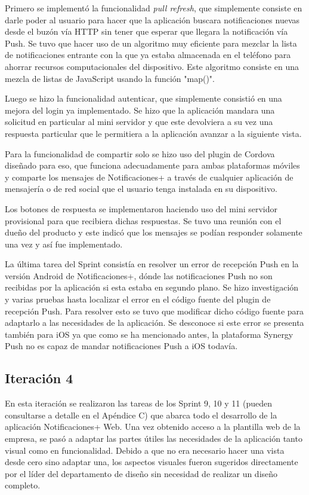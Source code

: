 Primero se implementó la funcionalidad \textit{pull refresh}, que simplemente consiste en darle poder al usuario para hacer que la aplicación buscara notificaciones nuevas desde el buzón vía HTTP sin tener que esperar que llegara la notificación vía Push. Se tuvo que hacer uso de un algoritmo muy eficiente para mezclar la lista de notificaciones entrante con la que ya estaba almacenada en el teléfono para ahorrar recursos computacionales del dispositivo. Este algoritmo consiste en una mezcla de listas de JavaScript usando la función "map()".

Luego se hizo la funcionalidad autenticar, que simplemente consistió en una mejora del login ya implementado. Se hizo que la aplicación mandara una solicitud en particular al mini servidor y que este devolviera a su vez una respuesta particular que le permitiera a la aplicación avanzar a la siguiente vista.


Para la funcionalidad de compartir solo se hizo uso del plugin de Cordova diseñado para eso, que funciona adecuadamente para ambas plataformas móviles y comparte los mensajes de Notificaciones+ a través de cualquier aplicación de mensajería o de red social que el usuario tenga instalada en su dispositivo. 


Los botones de respuesta se implementaron haciendo uso del mini servidor provisional para que recibiera dichas respuestas. Se tuvo una reunión con el dueño del producto y este indicó que los mensajes se podían responder solamente una vez y así fue implementado.


La última tarea del Sprint consistía en resolver un error de recepción Push en la versión Android de Notificaciones+, dónde las notificaciones Push no son recibidas por la aplicación si esta estaba en segundo plano. Se hizo investigación y varias pruebas hasta localizar el error en el código fuente del plugin de recepción Push. Para resolver esto se tuvo que modificar dicho código fuente para adaptarlo a las necesidades de la aplicación. Se desconoce si este error se presenta también para iOS ya que como se ha mencionado antes, la plataforma Synergy Push no es capaz de mandar notificaciones Push a iOS todavía.


\subsection{Iteración 4}
En esta iteración se realizaron las tareas de los Sprint 9, 10 y 11 (pueden consultarse a detalle en el Apéndice C) que abarca todo el desarrollo de la aplicación Notificaciones+ Web. Una vez obtenido acceso a la plantilla web de la empresa, se pasó a adaptar las partes útiles las necesidades de la aplicación tanto visual como en funcionalidad. Debido a que no era necesario hacer una vista desde cero sino adaptar una, los aspectos visuales fueron sugeridos directamente por el líder del departamento de diseño sin necesidad de realizar un diseño completo.


